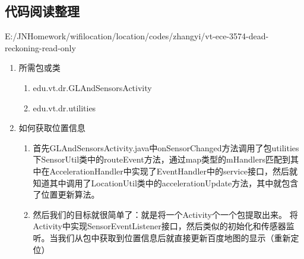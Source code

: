 \subsection{代码阅读整理}
E:/JNHomework/wifilocation/location/codes/zhangyi/vt-ece-3574-dead-reckoning-read-only
\begin{enumerate}
\item
所需包或类
\begin{enumerate}
\item
edu.vt.dr.GLAndSensorsActivity
\item
edu.vt.dr.utilities
\end{enumerate}
\item
如何获取位置信息
\begin{enumerate}
\item
首先GLAndSensorsActivity.java中onSensorChanged方法调用了包utilities下SensorUtil类中的routeEvent方法，通过map类型的mHandlers匹配到其中在AccelerationHandler中实现了EventHandler中的service接口，然后就知道其中调用了LocationUtil类中的accelerationUpdate方法，其中就包含了位置更新算法。
\item
然后我们的目标就很简单了：就是将一个Activity个一个包提取出来。
将Activity中实现SensorEventListener接口，然后类似的初始化和传感器监听。当我们从包中获取到位置信息后就直接更新百度地图的显示（重新定位）
\end{enumerate}
\end{enumerate}

